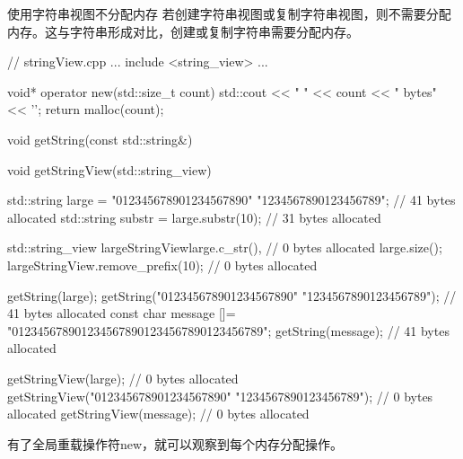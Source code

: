 \begin{myTip}{使用字符串视图不分配内存}
若创建字符串视图或复制字符串视图，则不需要分配内存。这与字符串形成对比，创建或复制字符串需要分配内存。


\begin{cpp}
// stringView.cpp
...
include <string_view>
...

void* operator new(std::size_t count){
	std::cout << " " << count << " bytes" << '\n';
	return malloc(count);
}

void getString(const std::string&){}

void getStringView(std::string_view){}

std::string large = "012345678901234567890"
					"1234567890123456789"; // 41 bytes allocated
std::string substr = large.substr(10); // 31 bytes allocated

std::string_view largeStringView{large.c_str(), // 0 bytes allocated
								large.size()};
largeStringView.remove_prefix(10); // 0 bytes allocated

getString(large);
getString("012345678901234567890"
		  "1234567890123456789"); // 41 bytes allocated
const char message []= "0123456789012345678901234567890123456789";
getString(message); // 41 bytes allocated

getStringView(large); // 0 bytes allocated
getStringView("012345678901234567890"
			  "1234567890123456789"); // 0 bytes allocated
getStringView(message); // 0 bytes allocated
\end{cpp}

有了全局重载操作符new，就可以观察到每个内存分配操作。

\end{myTip}
























